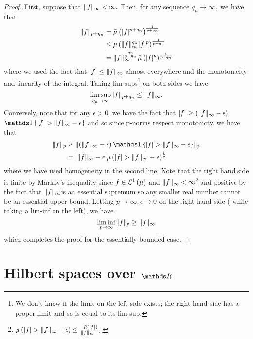 \begin{proof}
First, suppose that $\lVert f\rVert_{\infty}<\infty.$ Then, for any sequence
$q_{n}\to\infty,$ we have that 
\begin{align*}
\lVert f\rVert_{p+q_{n}} & =\bar{\mu}\left(\lvert f\rvert^{p+q_{n}}\right)^{\frac{1}{p+q_{n}}}\\
 & \leq\bar{\mu}\left(\lVert f\rVert_{\infty}^{q_{n}}\lvert f\rvert^{p}\right)^{\frac{1}{p+q_{n}}}\\
 & =\lVert f\rVert_{\infty}^{\frac{q_{n}}{p+q_{n}}}\bar{\mu}\left(\lvert f\rvert^{p}\right)^{\frac{1}{p+q_{n}}}
\end{align*}
where we used the fact that $\lvert f\rvert\leq\lVert f\rVert_{\infty}$
almost everywhere and the monotonicity and linearity of the integral.
Taking lim-sups\footnote{We don't know if the limit on the left side exists; the right-hand
side has a proper limit and so is equal to its lim-sup.} on both sides we have 
\[
\limsup_{q_{n}\to\infty}\lVert f\rVert_{p+q_{n}}\leq\lVert f\rVert_{\infty}.
\]
Conversely, note that for any $\epsilon>0$, we have the fact that
$\lvert f\rvert\geq\left(\lVert f\rVert_{\infty}-\epsilon\right)$$\indicate\left\{ \lvert f\rvert>\pnorm f{\infty}-\epsilon\right\} $
and so since p-norms respect monotonicty, we have that 
\begin{align*}
\pnorm fp & \geq\pnorm{\left(\pnorm f{\infty}-\epsilon\right)\indicate\left\{ \lvert f\rvert>\pnorm f{\infty}-\epsilon\right\} }p\\
 & =\lvert\pnorm f{\infty}-\epsilon\rvert\mu\left(\lvert f\rvert>\pnorm f{\infty}-\epsilon\right)^{\frac{1}{p}}
\end{align*}
where we have used homogeneity in the second line. Note that the right
hand side is finite by Markov's inequality since $f\in\mathcal{L}^{1}\left(\mu\right)$
and $\lVert f\rVert_{\infty}<\infty$\footnote{$\mu\left(\lvert f\rvert>\lVert f\rVert_{\infty}-\epsilon\right)\leq\frac{\bar{\mu}\left(\lvert f\rvert\right)}{\lVert f\rVert_{\infty}-\epsilon}$}
and positive by the fact that $\lVert f\rVert_{\infty}$is an essential supremum
so any smaller real number cannot be an essential upper bound. Letting
$p\to\infty,\epsilon\to0$ on the right hand side ( while taking a
lim-inf on the left), we have
\[
\liminf_{p\to\infty}\lVert f\rVert_{p}\geq\lVert f\rVert_{\infty}
\]
which completes the proof for the essentially bounded case.
\end{proof}

\section{Hilbert spaces over $\protect\R$}

